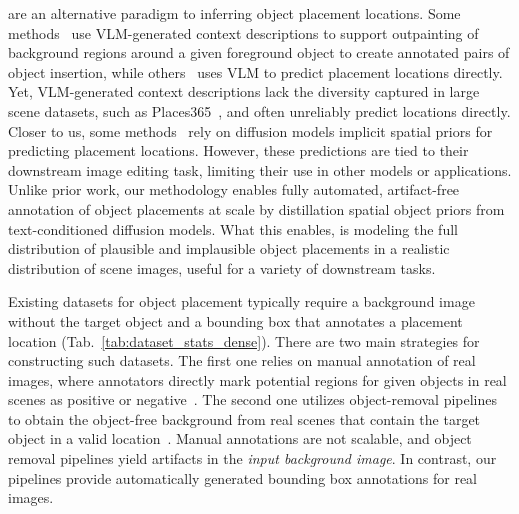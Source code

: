  are an alternative paradigm to inferring object placement locations. Some methods~\cite{canet2024thinking,he2024affordance,yuan2023learning} use VLM-generated context descriptions to support outpainting of background regions around a given foreground object to create annotated pairs of object insertion, while others~\cite{li2025freeinsert,liang2025hocomp} uses VLM to predict placement locations directly. Yet, VLM-generated context descriptions lack the diversity captured in large scene datasets, such as Places365~\cite{zhou2017places}, and  often unreliably predict locations directly. Closer to us, some methods~\cite{GaoJosephDeLaTorre2025Teleportraits,tewel2025addit,parihar2024text2place,liang2025hocomp,kulal2023putting} rely on diffusion models implicit spatial priors %
for predicting placement locations. However, these predictions are tied to their downstream image editing task, limiting their use in other models or applications. Unlike prior work, our methodology enables fully automated, artifact-free annotation of object placements at scale by distillation spatial object priors from text-conditioned diffusion models. What this enables, is modeling the full distribution of plausible and implausible object placements in a realistic distribution of scene images, useful for a variety of downstream tasks.


 Existing datasets for object placement typically require a background image without the target object and a bounding box that annotates a placement location (Tab.~\ref{tab:dataset_stats_dense}).
There are two main strategies for constructing such datasets. The first one relies on manual annotation of real images, where annotators directly mark potential regions for given objects in real scenes as positive or negative~\cite{liu2021opa,li2023dreamedit,lu2023dreamcom}. The second one utilizes object-removal pipelines to obtain the object-free background from real scenes that contain the target object in a valid location~\cite{parihar2024text2place,wasserman2024paint,winter2025objectmate}.
%
Manual annotations are not scalable, and object removal pipelines yield artifacts in the \textit{input background image}. In contrast, our pipelines provide automatically generated bounding box annotations for real images. 


